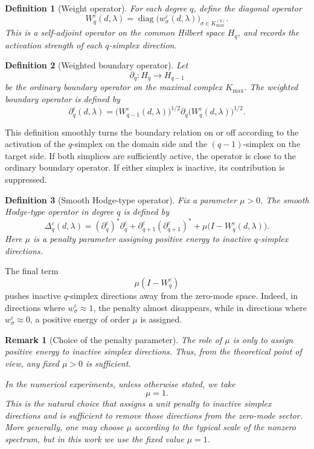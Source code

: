\documentclass[pdflatex,sn-mathphys-num]{sn-jnl}%
\theoremstyle{thmstyleone}%
\theoremstyle{thmstyletwo}%
\newtheorem{remark}{Remark}%
\theoremstyle{thmstylethree}%
\newtheorem{definition}{Definition}%
\begin{document}
\begin{definition}[Weight operator]
For each degree \(q\), define the diagonal operator
\[
W_q^\varepsilon(d,\lambda)
=
\operatorname{diag}
\bigl(
w_\sigma^\varepsilon(d,\lambda)
\bigr)_{\sigma\in K_{\max}^{(q)}}.
\]
This is a self-adjoint operator on the common Hilbert space \(H_q\), and records
the activation strength of each \(q\)-simplex direction.
\end{definition}

\begin{definition}[Weighted boundary operator]
Let
\[
\partial_q:H_q\to H_{q-1}
\]
be the ordinary boundary operator on the maximal complex \(K_{\max}\). The
weighted boundary operator is defined by
\[
\partial_q^\varepsilon(d,\lambda)
=
\bigl(W_{q-1}^\varepsilon(d,\lambda)\bigr)^{1/2}
\partial_q
\bigl(W_q^\varepsilon(d,\lambda)\bigr)^{1/2}.
\]
\end{definition}

This definition smoothly turns the boundary relation on or off according to the
activation of the \(q\)-simplex on the domain side and the \((q-1)\)-simplex on
the target side. If both simplices are sufficiently active, the operator is close
to the ordinary boundary operator. If either simplex is inactive, its
contribution is suppressed.

\begin{definition}[Smooth Hodge-type operator]
Fix a parameter \(\mu>0\). The smooth Hodge-type operator in degree \(q\) is
defined by
\[
\Delta_q^\varepsilon(d,\lambda)
=
(\partial_q^\varepsilon)^\ast\partial_q^\varepsilon
+
\partial_{q+1}^\varepsilon(\partial_{q+1}^\varepsilon)^\ast
+
\mu\bigl(I-W_q^\varepsilon(d,\lambda)\bigr).
\]
Here \(\mu\) is a penalty parameter assigning positive energy to inactive
\(q\)-simplex directions.
\end{definition}

The final term
\[
\mu(I-W_q^\varepsilon)
\]
pushes inactive \(q\)-simplex directions away from the zero-mode space. Indeed,
in directions where \(w_\sigma^\varepsilon\approx 1\), the penalty almost
disappears, while in directions where \(w_\sigma^\varepsilon\approx 0\), a
positive energy of order \(\mu\) is assigned.

\begin{remark}[Choice of the penalty parameter]
The role of \(\mu\) is only to assign positive energy to inactive simplex
directions. Thus, from the theoretical point of view, any fixed \(\mu>0\) is
sufficient.

In the numerical experiments, unless otherwise stated, we take
\[
\mu=1.
\]
This is the natural choice that assigns a unit penalty to inactive simplex
directions and is sufficient to remove those directions from the zero-mode
sector. More generally, one may choose \(\mu\) according to the typical scale of
the nonzero spectrum, but in this work we use the fixed value \(\mu=1\).
\end{remark}
\end{document}
